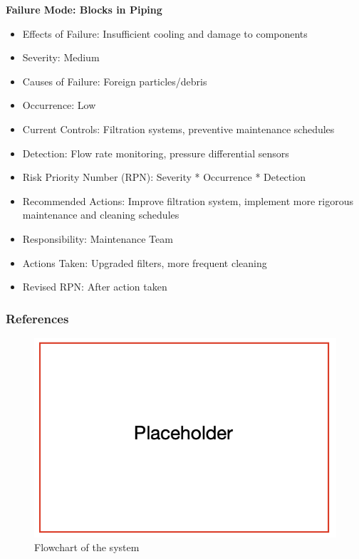 \textbf{Failure Mode: Blocks in Piping}
\begin{itemize}
  \item Effects of Failure: Insufficient cooling and damage to components
  \item Severity: Medium
  \item Causes of Failure: Foreign particles/debris
  \item Occurrence: Low
  \item Current Controls: Filtration systems, preventive maintenance schedules
  \item Detection: Flow rate monitoring, pressure differential sensors
  \item Risk Priority Number (RPN): Severity * Occurrence * Detection
  \item Recommended Actions: Improve filtration system, implement more rigorous maintenance and cleaning schedules
  \item Responsibility: Maintenance Team
  \item Actions Taken: Upgraded filters, more frequent cleaning
  \item Revised RPN: After action taken
\end{itemize}
\subsubsection{References}

\begin{figure}[ht]
  \centering
  \includegraphics[width=\linewidth]{texfiles/mech/eimg/cooling/placeholder}
  \caption{Flowchart of the system}
  \label{fig:schematic}
\end{figure}



